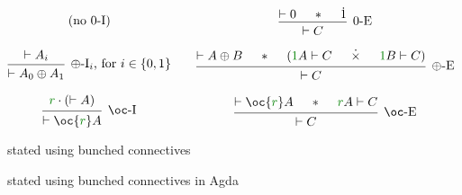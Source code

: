 \begin{figure}
\begin{displaymath}
\begin{matrix}
      \textrm{(no $0$-I)}
      &&
      \begin{prooftree}
        \hypo{\vdash 0}
        \hypo{\sep}
        \hypo{\dot1}
        \infer3[$0$-E]{\vdash C}
      \end{prooftree}
      \\\\
      \begin{prooftree}
        \hypo{\vdash A_i}
        \infer1[$\oplus$-I$_i$, for $i \in \{0,1\}$]{\vdash A_0 \oplus A_1}
      \end{prooftree}
      &&
      \begin{prooftree}
        \hypo{\vdash A \oplus B}
        \hypo{\sep}
        \hypo{(\gr1A \vdash C}
        \hypo{\dottimes}
        \hypo{\gr1B \vdash C)}
        \infer5[$\oplus$-E]{\vdash C}
      \end{prooftree}
      \\\\
      \begin{prooftree}
        \hypo{\gr r \cdot (\vdash A)}
        \infer1[$\oc$-I]{\vdash \oc{\gr r} A}
      \end{prooftree}
      &&
      \begin{prooftree}
        \hypo{\vdash \oc{\gr r} A}
        \hypo{\sep}
        \hypo{\gr rA \vdash C}
        \infer3[$\oc$-E]{\vdash C}
      \end{prooftree}
    \end{matrix}
  \end{displaymath}
  \caption{\name{} stated using bunched connectives}
  \label{fig:lr-bunched}
\end{figure}

\begin{figure}
  \caption{\name{} stated using bunched connectives in Agda}
  \label{fig:lr-bunched-Agda}
\end{figure}

